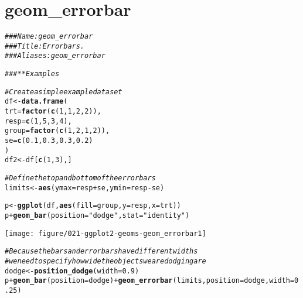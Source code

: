 \documentclass[a4paper,titlepage]{tufte-handout}\usepackage[]{graphicx}\usepackage[]{color}
\makeatletter
\def\maxwidth{ %
  \ifdim\Gin@nat@width>\linewidth
    \linewidth
  \else
    \Gin@nat@width
  \fi
}
\newcommand{\hlnum}[1]{\textcolor[rgb]{0.686,0.059,0.569}{#1}}%
\newcommand{\hlstr}[1]{\textcolor[rgb]{0.192,0.494,0.8}{#1}}%
\newcommand{\hlcom}[1]{\textcolor[rgb]{0.678,0.584,0.686}{\textit{#1}}}%
\newcommand{\hlopt}[1]{\textcolor[rgb]{0,0,0}{#1}}%
\newcommand{\hlstd}[1]{\textcolor[rgb]{0.345,0.345,0.345}{#1}}%
\newcommand{\hlkwb}[1]{\textcolor[rgb]{0.69,0.353,0.396}{#1}}%
\newcommand{\hlkwc}[1]{\textcolor[rgb]{0.333,0.667,0.333}{#1}}%
\newcommand{\hlkwd}[1]{\textcolor[rgb]{0.737,0.353,0.396}{\textbf{#1}}}%
\newenvironment{kframe}{%
 \def\at@end@of@kframe{}%
 \ifinner\ifhmode%
  \def\at@end@of@kframe{\end{minipage}}%
  \begin{minipage}{\columnwidth}%
 \fi\fi%
 \def\FrameCommand##1{\hskip\@totalleftmargin \hskip-\fboxsep
 \colorbox{shadecolor}{##1}\hskip-\fboxsep
     \hskip-\linewidth \hskip-\@totalleftmargin \hskip\columnwidth}%
 \MakeFramed {\advance\hsize-\width
   \@totalleftmargin\z@ \linewidth\hsize
   \@setminipage}}%
 {\par\unskip\endMakeFramed%
 \at@end@of@kframe}
\newenvironment{knitrout}{}{} %
\makeatother
\begin{document}
\section{geom\_errorbar}

\begin{knitrout}
\color{fgcolor}\begin{kframe}
\begin{alltt}
\hlcom{### Name: geom_errorbar}
\hlcom{### Title: Error bars.}
\hlcom{### Aliases: geom_errorbar}

\hlcom{### ** Examples}

\hlcom{# Create a simple example dataset}
\hlstd{df} \hlkwb{<-} \hlkwd{data.frame}\hlstd{(}
  \hlkwc{trt} \hlstd{=} \hlkwd{factor}\hlstd{(}\hlkwd{c}\hlstd{(}\hlnum{1}\hlstd{,} \hlnum{1}\hlstd{,} \hlnum{2}\hlstd{,} \hlnum{2}\hlstd{)),}
  \hlkwc{resp} \hlstd{=} \hlkwd{c}\hlstd{(}\hlnum{1}\hlstd{,} \hlnum{5}\hlstd{,} \hlnum{3}\hlstd{,} \hlnum{4}\hlstd{),}
  \hlkwc{group} \hlstd{=} \hlkwd{factor}\hlstd{(}\hlkwd{c}\hlstd{(}\hlnum{1}\hlstd{,} \hlnum{2}\hlstd{,} \hlnum{1}\hlstd{,} \hlnum{2}\hlstd{)),}
  \hlkwc{se} \hlstd{=} \hlkwd{c}\hlstd{(}\hlnum{0.1}\hlstd{,} \hlnum{0.3}\hlstd{,} \hlnum{0.3}\hlstd{,} \hlnum{0.2}\hlstd{)}
\hlstd{)}
\hlstd{df2} \hlkwb{<-} \hlstd{df[}\hlkwd{c}\hlstd{(}\hlnum{1}\hlstd{,}\hlnum{3}\hlstd{),]}

\hlcom{# Define the top and bottom of the errorbars}
\hlstd{limits} \hlkwb{<-} \hlkwd{aes}\hlstd{(}\hlkwc{ymax} \hlstd{= resp} \hlopt{+} \hlstd{se,} \hlkwc{ymin}\hlstd{=resp} \hlopt{-} \hlstd{se)}

\hlstd{p} \hlkwb{<-} \hlkwd{ggplot}\hlstd{(df,} \hlkwd{aes}\hlstd{(}\hlkwc{fill}\hlstd{=group,} \hlkwc{y}\hlstd{=resp,} \hlkwc{x}\hlstd{=trt))}
\hlstd{p} \hlopt{+} \hlkwd{geom_bar}\hlstd{(}\hlkwc{position}\hlstd{=}\hlstr{"dodge"}\hlstd{,} \hlkwc{stat}\hlstd{=}\hlstr{"identity"}\hlstd{)}
\end{alltt}
\end{kframe}
\texttt{[image: figure/021-ggplot2-geoms-geom\_errorbar1]} 
\begin{kframe}\begin{alltt}
\hlcom{# Because the bars and errorbars have different widths}
\hlcom{# we need to specify how wide the objects we are dodging are}
\hlstd{dodge} \hlkwb{<-} \hlkwd{position_dodge}\hlstd{(}\hlkwc{width}\hlstd{=}\hlnum{0.9}\hlstd{)}
\hlstd{p} \hlopt{+} \hlkwd{geom_bar}\hlstd{(}\hlkwc{position}\hlstd{=dodge)} \hlopt{+} \hlkwd{geom_errorbar}\hlstd{(limits,} \hlkwc{position}\hlstd{=dodge,} \hlkwc{width}\hlstd{=}\hlnum{0.25}\hlstd{)}
\end{alltt}



\end{kframe}
\end{knitrout}
\end{document}
